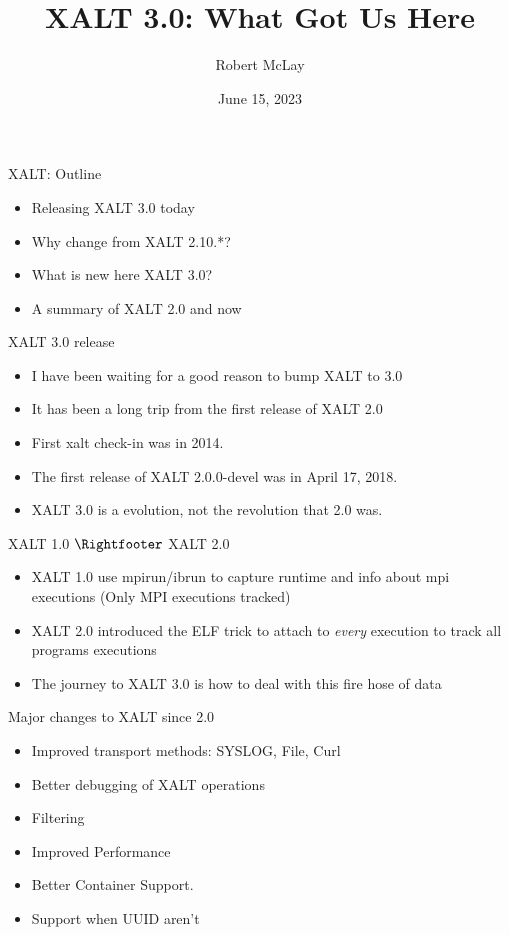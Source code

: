 \documentclass{beamer}
\begin{document}
\title[XALT]{XALT 3.0: What Got Us Here}
\author{Robert McLay}
\date{June 15, 2023}

\frame{\titlepage}

\begin{frame}{XALT: Outline}
  \begin{itemize}
    \item Releasing XALT 3.0 today
    \item Why change from XALT 2.10.*?
    \item What is new here XALT 3.0?
    \item A summary of XALT 2.0 and now
  \end{itemize}
\end{frame}

\begin{frame}{XALT 3.0 release}
  \begin{itemize}
    \item I have been waiting for a good reason to bump XALT to 3.0
    \item It has been a long trip from the first release of XALT 2.0
    \item First xalt check-in was in 2014.
    \item The first release of XALT 2.0.0-devel was in April 17, 2018.
    \item XALT 3.0 is a evolution, not the revolution that 2.0 was.
  \end{itemize}
\end{frame}

\begin{frame}{XALT 1.0 $\Rightfooter$ XALT 2.0}
  \begin{itemize}
    \item XALT 1.0 use mpirun/ibrun to capture runtime and info about
      mpi executions (Only MPI executions tracked)
    \item XALT 2.0 introduced the ELF trick to attach to \emph{every}
      execution to track all programs executions
    \item The journey to XALT 3.0 is how to deal with this fire hose of
      data
  \end{itemize}
\end{frame}

\begin{frame}{Major changes to XALT since 2.0}
  \begin{itemize}
    \item Improved transport methods: SYSLOG, File, Curl
    \item Better debugging of XALT operations
    \item Filtering
    \item Improved Performance
    \item Better Container Support.
    \item Support when UUID aren't
  \end{itemize}
\end{frame}
\end{document}

